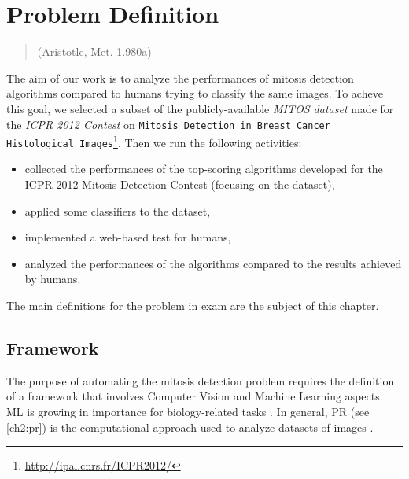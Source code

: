 \chapter{Problem Definition}
\label{chapter3}
\thispagestyle{empty}

\begin{quotation}
{\footnotesize
{}
\begin{flushright}
(Aristotle, Met. 1.980a)
\end{flushright}
}
\end{quotation}


The aim of our work is to analyze the performances of mitosis detection algorithms compared to humans trying to classify the same images.
To acheve this goal, we selected a subset of the publicly-available \textit{MITOS dataset} made for the \textit{ICPR 2012 Contest} on
\texttt{Mitosis Detection in Breast Cancer Histological Images}\footnote{\url{http://ipal.cnrs.fr/ICPR2012/}}.
Then we run the following activities:

\begin{itemize}
 \item collected the performances of the top-scoring algorithms developed for the ICPR 2012 Mitosis Detection Contest (focusing on the dataset),
 \item applied some classifiers to the dataset,
 \item implemented a web-based test for humans,
 \item analyzed the performances of the algorithms compared to the results achieved by humans.
\end{itemize}

The main definitions for the problem in exam are the subject of this chapter.

\section{Framework}


The purpose of automating the mitosis detection problem requires the definition of a framework that involves Computer Vision and Machine Learning aspects.
\Gls{ML} is growing in importance for biology-related tasks \cite{tarca2007machine}.
In general, \Gls{PR} (see \ref{ch2:pr}) is the computational approach used to analyze datasets of images \cite{patternRecSWBioImages01}.

